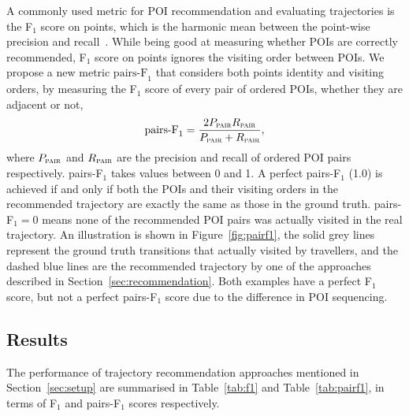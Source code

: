 A commonly used metric for POI recommendation and evaluating trajectories is
the F$_1$ score on points, which is the harmonic mean between the point-wise precision and recall~\cite{ijcai15}.
While being good at measuring whether POIs are correctly recommended, 
F$_1$ score on points ignores the visiting order between POIs.
We propose a new metric $\text{pairs-F}_1$ that considers both points identity and visiting orders, 
by measuring the F$_1$ score of every pair of ordered POIs, whether they are adjacent or not,
\eqmoveup
\begin{displaymath}
\text{pairs-F}_1 = \frac{2 P_{\textsc{pair}} R_{\textsc{pair}}}
                        {P_{\textsc{pair}} + R_{\textsc{pair}}},
\end{displaymath}
where $P_{\textsc{pair}}$ and $R_{\textsc{pair}}$ are the precision and recall of ordered POI pairs respectively.
pairs-F$_1$ takes values between 0 and 1. A perfect pairs-F$_1$ (1.0) is achieved if and only if
both the POIs and their visiting orders in the
recommended trajectory are exactly the same as those in the ground truth.
pairs-F$_1 = 0$ means none of the recommended POI pairs was actually visited in the real trajectory.
An illustration is shown in Figure~\ref{fig:pairf1},
the solid grey lines represent the ground truth transitions that actually visited by travellers,
and the dashed blue lines are the recommended trajectory by one of the approaches described in Section~\ref{sec:recommendation}.
Both examples have a perfect F$_1$ score, but not a perfect pairs-F$_1$ score due to the difference in POI sequencing.



\subsection{Results}
\label{sec:result}
\secmoveup


%
%
%

The performance of trajectory recommendation approaches mentioned in Section~\ref{sec:setup} are summarised in 
Table~\ref{tab:f1} and Table~\ref{tab:pairf1},
in terms of F$_1$ and pairs-F$_1$ scores respectively.





